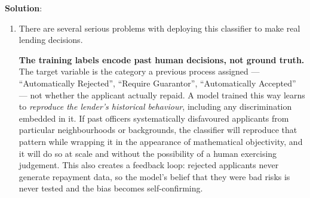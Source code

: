 \documentclass[submit]{../harvardml}
\newenvironment{solution}{
    \vspace{2mm}
    \color{blue}\noindent\textbf{Solution}:
}{}
\begin{document}
\begin{solution}
\begin{enumerate}
\noindent Five of the six models say reject; only model (d) disagrees, and it does so
for a revealing reason --- its $x_2^2$ feature maps this very low credit score
($x_2 = -1.57$) to the same value as a high one ($x_2 = +1.57$), so the applicant is
confused with the well-qualified cluster. Each model reaches its decision differently:
the generative models (a) and (b) ask which class's fitted Gaussian makes
$\boldx^*$ most likely (weighted by the class prior); the discriminative models (c)
and (d) just evaluate which $\boldw_k^\top\boldx^*$ is largest; and kNN simply reads
off the labels of the nearest training applicants. The crucial thing to be aware of is
that this point lies \emph{far outside} the training data --- no training applicant has
a credit score near $350$ --- so every one of these numbers is an extrapolation. The
reported probabilities of $1.000$ and $10^{-33}$ are not evidence of certainty but an
artifact of the models' functional forms being extended into a region where no data
constrains them: softmax log-odds grow without bound as you move away from the
boundary, and Gaussian densities decay exponentially, so both produce arbitrarily
extreme confidence off the edge of the data. Exactly as in Problem 1.5, the honest
summary is high epistemic uncertainty masquerading as near-zero aleatoric uncertainty,
and the models' disagreement here (five to one) is a far better uncertainty signal than
any single model's probability.

\item
There are several serious problems with deploying this classifier to make real lending
decisions.

\noindent\textbf{The training labels encode past human decisions, not ground truth.}
The target variable is the category a previous process assigned --- ``Automatically
Rejected'', ``Require Guarantor'', ``Automatically Accepted'' --- not whether the
applicant actually repaid. A model trained this way learns to \emph{reproduce the
lender's historical behaviour}, including any discrimination embedded in it. If past
officers systematically disfavoured applicants from particular neighbourhoods or
backgrounds, the classifier will reproduce that pattern while wrapping it in the
appearance of mathematical objectivity, and it will do so at scale and without the
possibility of a human exercising judgement. This also creates a feedback loop:
rejected applicants never generate repayment data, so the model's belief that they
were bad risks is never tested and the bias becomes self-confirming.


\end{enumerate}
\end{solution}
\end{document}
